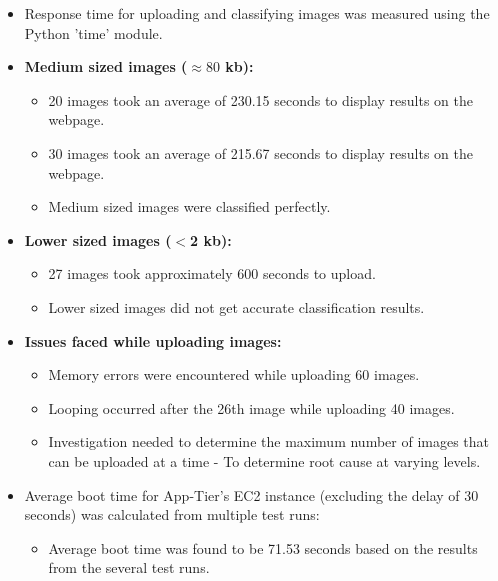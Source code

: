 \documentclass[../main.tex]{subfiles}
\begin{document}
\begin{itemize}
    \item Response time for uploading and classifying images was measured using the Python 'time' module.
    \item \textbf{Medium sized images ($\approx 80$ kb):}
    \begin{itemize}
        \item 20 images took an average of 230.15 seconds to display results on the webpage.
        \item 30 images took an average of 215.67 seconds to display results on the webpage.
        \item Medium sized images were classified perfectly.
    \end{itemize}        
    \item \textbf{Lower sized images ($<$2 kb):}
    \begin{itemize}
        \item 27 images took approximately 600 seconds to upload.
        \item Lower sized images did not get accurate classification results.
    \end{itemize}
    \item \textbf{Issues faced while uploading images:}
    \begin{itemize}
        \item Memory errors were encountered while uploading 60 images.
        \item Looping occurred after the 26th image while uploading 40 images.
        \item Investigation needed to determine the maximum number of images that can be uploaded at a time - To determine root cause at varying levels.
    \end{itemize}
    \item Average boot time for App-Tier's EC2 instance (excluding the delay of 30 seconds) was calculated from multiple test runs:
    \begin{itemize}
        \item Average boot time was found to be 71.53 seconds based on the results from the several test runs.
    \end{itemize}
\end{itemize}


\end{document}

